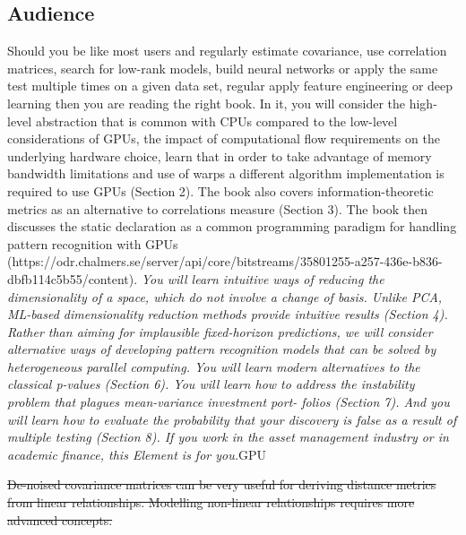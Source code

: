 \documentclass[10pt]{article}[draft]
\begin{document}
		
\subsection{Audience}

Should you be like most users and  regularly estimate covariance, use correlation matrices, search for low-rank models, build neural networks or apply the same test multiple times on a given data set, regular apply feature engineering or deep learning then you are reading the right book. In it, you will consider the high-level abstraction that is common with CPUs compared to the low-level considerations of GPUs, the impact of computational flow requirements on the underlying hardware choice, learn that in order to take advantage of memory bandwidth limitations  and use of warps a different algorithm implementation is required to use GPUs  (Section 2). The book also covers information-theoretic metrics as an alternative to  correlations measure (Section 3). The book then discusses the static declaration as a common programming paradigm for handling pattern recognition with GPUs (https://odr.chalmers.se/server/api/core/bitstreams/35801255-a257-436e-b836-dbfb114c5b55/content). \emph{You will learn intuitive ways of reducing the dimensionality of a space, which do not involve a change of basis. Unlike PCA, ML-based dimensionality reduction methods provide intuitive results (Section 4). Rather than aiming for implausible fixed-horizon predictions, we will consider alternative ways of developing pattern recognition models that can be solved by heterogeneous parallel computing. You will learn modern alternatives to the classical p-values (Section 6). You will learn how to address the instability problem that plagues mean-variance investment port- folios (Section 7). And you will learn how to evaluate the probability that your discovery is false as a result of multiple testing (Section 8). If you work in the asset management industry or in academic finance, this Element is for you.}GPU


		\st{De-noised covariance matrices can be very useful for deriving distance metrics from linear relationships. Modelling non-linear relationships requires more advanced concepts. }
		
\end{document}
